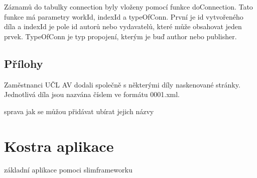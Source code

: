             Záznamů do tabulky connection byly vloženy pomocí funkce doConnection. Tato funkce má parametry workId, indexId a typeOfConn. První je id vytvořeného díla a indexId je pole id autorů nebo vydavatelů, které může obsahovat jeden prvek. TypeOfConn je typ propojení, kterým je buď author nebo publisher. 
            
        \subsection{Přílohy}
            Zaměstnanci UČL AV dodali společně s některými díly naskenované stránky. Jednotlivá díla jsou nazvána číslem ve formátu 0001.xml.
            
            sprava
                jak se můžou přidávat ubírat jejich názvy
            
        
    \section{Kostra aplikace}
        základní aplikace pomoci slimframeworku

